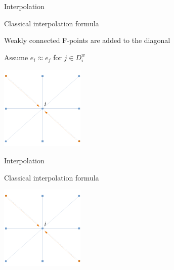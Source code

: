 \documentclass[18pt,xcolor=table]{beamer}
\begin{document}
\begin{frame}{Interpolation}
\begin{block}{Classical interpolation formula}
\bit
\item Weakly connected F-points are added to the diagonal
\item Assume $e_i\approx e_j$ for $j\in D^w_i$
\eit
\end{block}
\begin{center}
\includegraphics[width=0.3\textwidth]{../figures/interpStencilWeakF}
\end{center}
\end{frame}

\begin{frame}{Interpolation}
\begin{block}{Classical interpolation formula}
\end{block}
\begin{center}
\includegraphics[width=0.3\textwidth]{../figures/interpStencilWeakF}
\end{center}
\end{frame}
\end{document}

